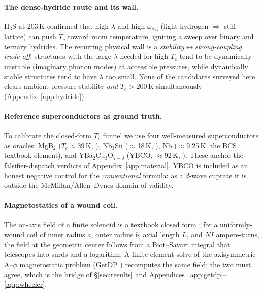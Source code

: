 \documentclass[11pt,a4paper]{article}
\begin{document}
\paragraph{The dense-hydride route and its wall.}
H$_3$S at 203\,K \citep{drozdov2015} confirmed that high $\lambda$ and
high $\omega_{\log}$ (light hydrogen $\Rightarrow$ stiff lattice) can
push $T_c$ toward room temperature, igniting a sweep over binary and
ternary hydrides. The recurring physical wall is a
\emph{stability$\leftrightarrow$strong-coupling trade-off}: structures
with the large $\lambda$ needed for high $T_c$ tend to be dynamically
unstable (imaginary phonon modes) at accessible pressures, while
dynamically stable structures tend to have $\lambda$ too small. None
of the candidates surveyed here clears ambient-pressure stability
\emph{and} $T_c\!>\!200$\,K simultaneously (Appendix~\ref{app:hydride}).

\paragraph{Reference superconductors as ground truth.}
To calibrate the closed-form $T_c$ funnel we use four well-measured
superconductors as oracles: MgB$_2$ ($T_c\!\approx\!39$\,K,
\citep{nagamatsu2001,budko2001}), Nb$_3$Sn ($\approx$18\,K,
\citep{godeke2006}), Nb ($\approx$9.25\,K, the BCS textbook element),
and YBa$_2$Cu$_3$O$_{7-\delta}$ (YBCO, $\approx$92\,K, \citep{wu1987}).
These anchor the falsifier-dispatch verdicts of Appendix~\ref{app:material}.
YBCO is included as an honest negative control for the
\emph{conventional} formula: as a $d$-wave cuprate it is outside the
McMillan/Allen--Dynes domain of validity.

\paragraph{Magnetostatics of a wound coil.}
The on-axis field of a finite solenoid is a textbook closed form
\citep{jackson1999}; for a uniformly-wound coil of inner radius $a$,
outer radius $b$, axial length $L$, and $NI$ ampere-turns, the field at
the geometric center follows from a Biot--Savart integral that
telescopes into surds and a logarithm. A finite-element solve of the
axisymmetric A--$\phi$ magnetostatic problem (GetDP \citep{getdp})
recomputes the same field; the two must agree, which is the bridge of
\S\ref{sec:results} and Appendices~\ref{app:getdp}--\ref{app:wheeler}.

\end{document}
